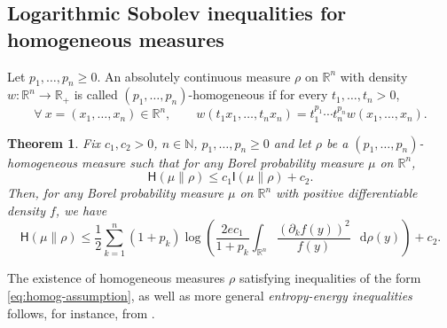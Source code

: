\documentclass[a4paper,twoside,11pt,reqno]{amsart}
\newtheorem{theorem}{Theorem}
\newcommand*\diff{\mathop{}\!\mathrm{d}}
\newcommand{\R}{\mathbb{R}} %
\newcommand{\N}{\mathbb{N}}
\newcommand{\II}{\mathsf{I}}
\newcommand{\HH}{\mathsf{H}}
\begin{document}

\subsection{Logarithmic Sobolev inequalities for homogeneous measures} \label{subsec:homogeneous}
Let $p_1,\ldots,p_n\geq0$. An absolutely continuous measure $\rho$ on $\R^n$ with density $w:\R^n\to\R_+$ is called $(p_1,\ldots,p_n)$-homogeneous if for every $t_1,\ldots,t_n>0$,
\begin{equation}
\forall \ x=(x_1,\ldots,x_n)\in\R^n, \qquad w(t_1x_1,\ldots,t_nx_n) = t_1^{p_1}\cdots t_n^{p_n} w(x_1,\ldots,x_n).
\end{equation}


\begin{theorem} \label{thm:homogeneous}
Fix $c_1,c_2>0$, $n\in\N$, $p_1,\ldots,p_n\geq0$ and let $\rho$ be a $(p_1,\ldots,p_n)$-homogeneous measure such that for any Borel probability measure $\mu$ on $\R^n$,
\begin{equation} \label{eq:homog-assumption}
\HH(\mu\|\rho)\leq c_1 \II(\mu\|\rho) + c_2.
\end{equation} 
Then, for any Borel probability measure $\mu$ on $\R^n$ with  positive differentiable density $f$, we have
\begin{equation}\label{eq:homog-conclusion}
\HH(\mu\|\rho)\leq  \frac{1}{2} \sum_{k=1}^n (1+p_k)  \log\left( \frac{2ec_1}{1+p_k} \int_{\R^n} \frac{(\partial_k f(y))^2}{f(y)} \,\diff\rho(y)\right) + c_2.
\end{equation}
\end{theorem}

The existence of homogeneous measures $\rho$ satisfying inequalities of the form \eqref{eq:homog-assumption}, as well as more general \emph{entropy-energy inequalities} follows, for instance, from \cite[Proposition~7.3.1]{BGL14}.
\end{document}
